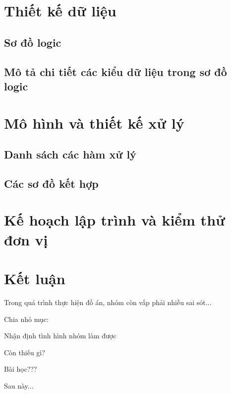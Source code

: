 \documentclass{article}
\begin{document}
	\section{Thiết kế dữ liệu}
	\subsection{Sơ đồ logic}
	\subsection{Mô tả chi tiết các kiểu dữ liệu trong sơ đồ logic}
	
	\section{Mô hình và thiết kế xử lý}
	\subsection{Danh sách các hàm xử lý}
	\subsection{Các sơ đồ kết hợp}
	
	\section{Kế hoạch lập trình và kiểm thử đơn vị}
	
	\section{Kết luận}
	
	Trong quá trình thực hiện đồ án, nhóm còn vấp phải nhiều sai sót...
	
	
	Chia nhỏ mục:
	
	Nhận định tình hình nhóm làm được
	
	Còn thiếu gì?
	
	Bài học???
	
	Sau này...
	
\end{document}
